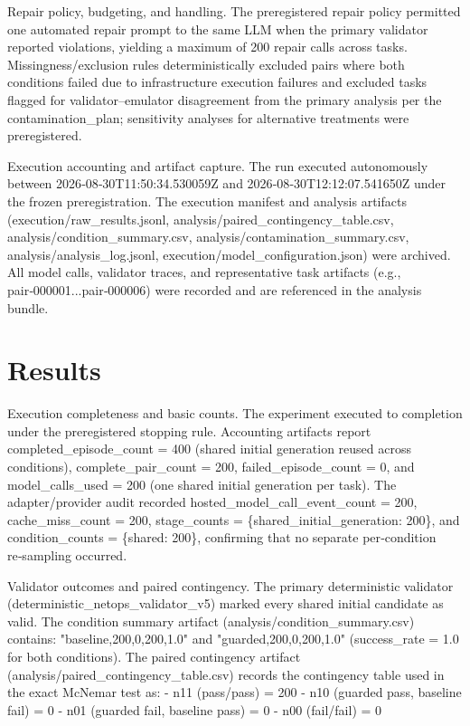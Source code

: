 \documentclass[conference]{IEEEtran}
\begin{document}
Repair policy, budgeting, and handling. The preregistered repair policy permitted one automated repair prompt to the same LLM when the primary validator reported violations, yielding a maximum of 200 repair calls across tasks. Missingness/exclusion rules deterministically excluded pairs where both conditions failed due to infrastructure execution failures and excluded tasks flagged for validator--emulator disagreement from the primary analysis per the contamination\_plan; sensitivity analyses for alternative treatments were preregistered.

Execution accounting and artifact capture. The run executed autonomously between 2026‑08‑30T11:50:34.530059Z and 2026‑08‑30T12:12:07.541650Z under the frozen preregistration. The execution manifest and analysis artifacts (execution/raw\_results.jsonl, analysis/paired\_contingency\_table.csv, analysis/condition\_summary.csv, analysis/contamination\_summary.csv, analysis/analysis\_log.jsonl, execution/model\_configuration.json) were archived. All model calls, validator traces, and representative task artifacts (e.g., pair‑000001...pair‑000006) were recorded and are referenced in the analysis bundle.

\section{Results}
Execution completeness and basic counts. The experiment executed to completion under the preregistered stopping rule. Accounting artifacts report completed\_episode\_count = 400 (shared initial generation reused across conditions), complete\_pair\_count = 200, failed\_episode\_count = 0, and model\_calls\_used = 200 (one shared initial generation per task). The adapter/provider audit recorded hosted\_model\_call\_event\_count = 200, cache\_miss\_count = 200, stage\_counts = \{shared\_initial\_generation: 200\}, and condition\_counts = \{shared: 200\}, confirming that no separate per‑condition re‑sampling occurred.

Validator outcomes and paired contingency. The primary deterministic validator (deterministic\_netops\_validator\_v5) marked every shared initial candidate as valid. The condition summary artifact (analysis/condition\_summary.csv) contains: "baseline,200,0,200,1.0" and "guarded,200,0,200,1.0" (success\_rate = 1.0 for both conditions). The paired contingency artifact (analysis/paired\_contingency\_table.csv) records the contingency table used in the exact McNemar test as:
- n11 (pass/pass) = 200
- n10 (guarded pass, baseline fail) = 0
- n01 (guarded fail, baseline pass) = 0
- n00 (fail/fail) = 0
\end{document}
